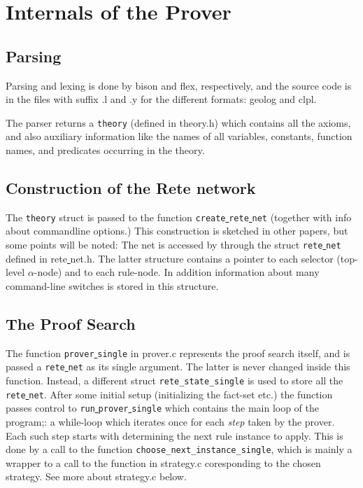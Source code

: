 \documentclass[a4paper]{article}
\begin{document}
\section{Internals of the Prover}

\subsection{Parsing}
Parsing and lexing is done by bison and flex, respectively, and the source code is in the files with suffix .l and .y for the different formats: geolog and clpl. 

The parser returns a \verb|theory| (defined in theory.h) which contains all the axioms, and also auxiliary information like the names of all variables, constants, function names, and predicates occurring in the theory. 

\subsection{Construction of the Rete network}
The \verb|theory| struct is passed to the function \verb|create|\underline{ }\verb|rete|\underline{ }\verb|net| (together with info about commandline options.) This construction is sketched in other papers, but some points will be noted: The net is accessed by through the struct \verb|rete|\underline{ }\verb|net| defined in rete\underline{ }net.h. The latter structure contains a pointer to each selector (top-level $\alpha$-node) and to each rule-node. In addition information about many command-line switches is stored in this structure. 

\subsection{The Proof Search}
The function \verb|prover|\underline{ }\verb|single| in prover.c represents the proof search itself, and is passed a \verb|rete|\underline{ }\verb|net| as its single argument. The latter is never changed inside this function. Instead, a different struct \verb|rete_state_single| is used to store all the \verb|rete|\underline{ }\verb|net|. After some initial setup (initializing the fact-set etc.) the function passes control to  \verb|run|\underline{ }\verb|prover|\underline{ }\verb|single| which contains the main loop of the program;: a while-loop which iterates once for each \emph{step} taken by the prover. Each such step starts with determining the next rule instance to apply. This is done by a call to the function \verb|choose_next_instance_single|, which is mainly a wrapper to a call to the function in strategy.c coresponding to the chosen strategy. See more about strategy.c below.
\end{document}
